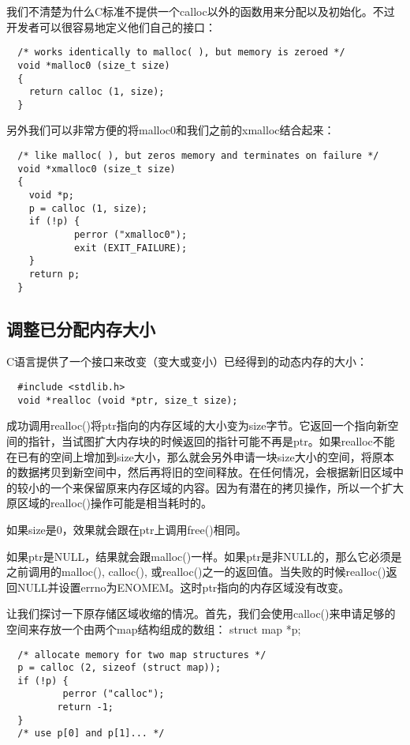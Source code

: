 我们不清楚为什么C标准不提供一个calloc以外的函数用来分配以及初始化。不过开发者可以很容易地定义他们自己的接口： 

\begin{lstlisting}
  /* works identically to malloc( ), but memory is zeroed */
  void *malloc0 (size_t size)
  {
    return calloc (1, size);
  }
\end{lstlisting}

另外我们可以非常方便的将malloc0和我们之前的xmalloc结合起来： 

\begin{lstlisting}
  /* like malloc( ), but zeros memory and terminates on failure */
  void *xmalloc0 (size_t size)
  {
    void *p;
    p = calloc (1, size);
    if (!p) {
            perror ("xmalloc0");
            exit (EXIT_FAILURE);
    }
    return p;
  }
\end{lstlisting}

\subsection{调整已分配内存大小}

C语言提供了一个接口来改变（变大或变小）已经得到的动态内存的大小：

\begin{lstlisting}
  #include <stdlib.h>
  void *realloc (void *ptr, size_t size);
\end{lstlisting}

成功调用realloc()将ptr指向的内存区域的大小变为size字节。它返回一个指向新空间的指针，当试图扩大内存块的时候返回的指针可能不再是ptr。如果realloc不能在已有的空间上增加到size大小，那么就会另外申请一块size大小的空间，将原本的数据拷贝到新空间中，然后再将旧的空间释放。在任何情况，会根据新旧区域中的较小的一个来保留原来内存区域的内容。因为有潜在的拷贝操作，所以一个扩大原区域的realloc()操作可能是相当耗时的。

如果size是0，效果就会跟在ptr上调用free()相同。

如果ptr是NULL，结果就会跟malloc()一样。如果ptr是非NULL的，那么它必须是之前调用的malloc(), calloc(), 或realloc()之一的返回值。当失败的时候realloc()返回NULL并设置errno为ENOMEM。这时ptr指向的内存区域没有改变。

让我们探讨一下原存储区域收缩的情况。首先，我们会使用calloc()来申请足够的空间来存放一个由两个map结构组成的数组： struct map *p; 

\begin{lstlisting}
  /* allocate memory for two map structures */
  p = calloc (2, sizeof (struct map));
  if (!p) {
          perror ("calloc");
         return -1;
  }
  /* use p[0] and p[1]... */
\end{lstlisting}


